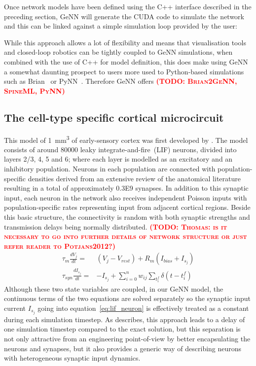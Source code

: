 \documentclass[utf8]{frontiersSCNS} %
\newcommand{\todo}[1]{\textbf{\textsc{\textcolor{red}{(TODO: #1)}}}}
\begin{document}
Once network models have been defined using the C++ interface described in the preceding section, GeNN will generate the CUDA code to simulate the network and this can be linked against a simple simulation loop provided by the user:



While this approach allows a lot of flexibility and means that visualisation tools and closed-loop robotics can be tightly coupled to GeNN simulations, when combined with the use of C++ for model definition, this does make using GeNN a somewhat daunting prospect to users more used to Python-based simulations such as Brian~\citep{Stimberg2014} or PyNN~\citep{Davison2008a}.
Therefore GeNN offers
\todo{Brian2GeNN, SpineML, PyNN}

\subsection{The cell-type specific cortical microcircuit}
\label{sec:method/microcircuit}
This model of \SI{1}{\milli\metre\cubed} of early-sensory cortex was first developed by \citet{Potjans2012}.
The model consists of around \num{80000} leaky integrate-and-fire~(LIF) neurons, divided into layers 2/3, 4, 5 and 6; where each layer is modelled as an excitatory and an inhibitory population.
Neurons in each population are connected with population-specific densities derived from an extensive review of the anatomical literature resulting in a total of approximately \num{0.3E9} synapses.
In addition to this synaptic input, each neuron in the network also receives independent Poisson inputs with population-specific rates representing input from adjacent cortical regions.
Beside this basic structure, the connectivity is random with both synaptic strengths and transmission delays being normally distributed.
\todo{Thomas: is it necessary to go into further details of network structure or just refer reader to Potjans2012?}
%
\begin{align}
    \tau_{m} \frac{dV_{j}}{dt} = & (V_{j} - V_{rest}) + R_{m}(I_{bias} + I_{s_{j}}) \label{eq:lif_neuron}\\
    \tau_{syn} \frac{dI_{s_{j}}}{dt} = & -I_{s_{j}} + \sum_{i=0}^{n} w_{ij} \sum_{t_{i}^{f}}  \delta(t - t_{i}^{f})\label{eq:exp_neuron_input_current}
\end{align}
%
Although these two state variables are coupled, in our GeNN model, the continuous terms of the two equations are solved separately so the synaptic input current $I_{s_{j}}$ going into equation~\ref{eq:lif_neuron} is effectively treated as a constant during each simulation timestep.
As \citet{Rotter1999} describes, this approach leads to a delay of one simulation timestep compared to the exact solution, but this separation is not only attractive from an engineering point-of-view by better encapsulating the neurons and synapses, but it also provides a generic way of describing neurons with heterogeneous synaptic input dynamics.
\end{document}
